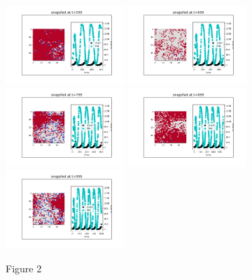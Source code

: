 \documentclass{article}
\begin{document}
\begin{figure}[htp]
    \includegraphics[width=0.4\textwidth]{599.png}
    \includegraphics[width=0.4\textwidth]{699.png}
    \includegraphics[width=0.4\textwidth]{799.png}
    \includegraphics[width=0.4\textwidth]{899.png}
    \includegraphics[width=0.4\textwidth]{999.png}
    \caption*{Figure 2}
\end{figure}
\end{document}
